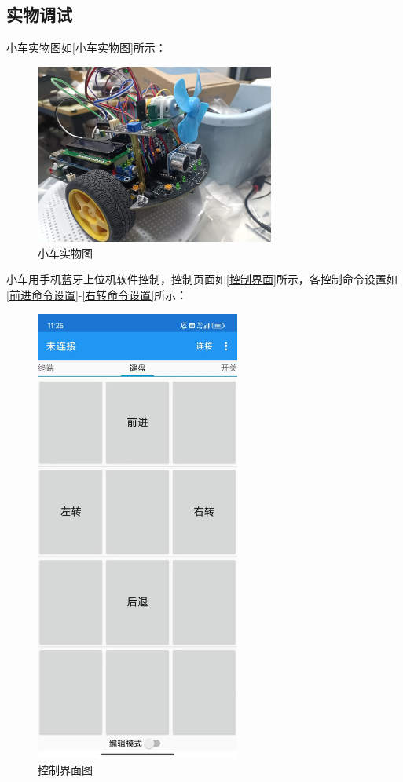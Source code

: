 \subsection{实物调试}
小车实物图如\autoref{小车实物图}所示：
\begin{figure}[!htbp]
    \centering
    \includegraphics[width =0.7\textwidth]{figures/小车实物正面图.jpg}
    \caption{小车实物图}
    \label{小车实物图}
\end{figure}
\newline
小车用手机蓝牙上位机软件控制，控制页面如\autoref{控制界面}所示，各控制命令设置如\autoref{前进命令设置}-\autoref{右转命令设置}所示：
\begin{figure}[!htbp]
    \centering
    \includegraphics[width =0.6\textwidth]{figures/控制界面.jpg}
    \caption{控制界面图}
    \label{控制界面}
\end{figure}
